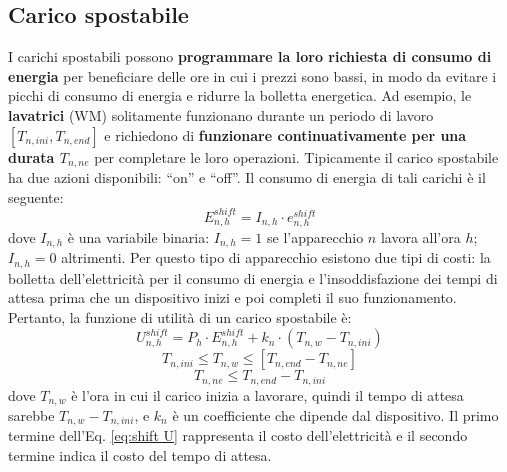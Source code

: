 \documentclass[italian, Lau, oneside]{sapthesis}
\begin{document}
\subsection{Carico spostabile}
I carichi spostabili possono \textbf{programmare la loro richiesta di consumo di energia} per beneficiare delle ore in cui i prezzi sono bassi, in modo da evitare i picchi di consumo di energia e ridurre la bolletta energetica. Ad esempio, le \textbf{lavatrici} (WM) solitamente funzionano durante un periodo di lavoro $[T_{n,ini}, T_{n,end}]$ e richiedono di \textbf{funzionare continuativamente per una durata $T_{n,ne}$} per completare le loro operazioni. Tipicamente il carico spostabile ha due azioni disponibili: “on” e “off”. Il consumo di energia di tali carichi è il seguente:
\begin{equation}
    E^{shift}_{n,h} = I_{n,h} \cdot e^{shift}_{n,h}
\end{equation}
dove $I_{n,h}$ è una variabile binaria: $I_{n,h} = 1$ se l'apparecchio $n$ lavora all'ora $h$; $I_{n,h} = 0$ altrimenti. Per questo tipo di apparecchio esistono due tipi di costi: la bolletta dell'elettricità per il consumo di energia e l'insoddisfazione dei tempi di attesa prima che un dispositivo inizi e poi completi il suo funzionamento. Pertanto, la funzione di utilità di un carico spostabile è:
\begin{equation}
\label{eq:shift U}
    U^{shift}_{n,h} = P_h \cdot E^{shift}_{n,h}+k_n \cdot (T_{n,w}-T_{n,ini})
\end{equation}
\begin{equation}
    T_{n,ini} \leq T_{n,w} \leq [T_{n,end}-T_{n,ne}]
\end{equation}
\begin{equation}
    T_{n,ne} \leq T_{n,end}-T_{n,ini}
\end{equation}
dove $T_{n,w}$ è l'ora in cui il carico inizia a lavorare, quindi il tempo di attesa sarebbe $T_{n,w} - T_{n,ini}$, e $k_n$ è un coefficiente che dipende dal dispositivo. Il primo termine dell'Eq. \ref{eq:shift U} rappresenta il costo dell'elettricità e il secondo termine indica il costo del tempo di attesa.
\end{document}
